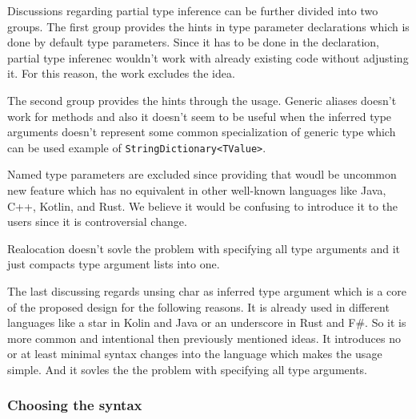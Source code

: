 Discussions regarding partial type inference can be further divided into two groups.
The first group provides the hints in type parameter declarations which is done by default type parameters.
Since it has to be done in the declaration, partial type inferenec wouldn't work with already existing code without adjusting it.
For this reason, the work excludes the idea.
\par
The second group provides the hints through the usage.
Generic aliases doesn't work for methods and also it doesn't seem to be useful when the inferred type arguments doesn't represent some common specialization of generic type which can be used example of \texttt{StringDictionary<TValue>}.
\par
Named type parameters are excluded since providing that woudl be uncommon new feature which has no equivalent in other well-known languages like Java, C++, Kotlin, and Rust.
We believe it would be confusing to introduce it to the users since it is controversial change.
\par
Realocation doesn't sovle the problem with specifying all type arguments and it just compacts type argument lists into one.
\par
The last discussing regards unsing char as inferred type argument which is a core of the proposed design for the following reasons.
It is already used in different languages like a star in Kolin and Java or an underscore in Rust and F\#.
So it is more common and intentional then previously mentioned ideas.
It introduces no or at least minimal syntax changes into the language which makes the usage simple.
And it sovles the the problem with specifying all type arguments.

\subsubsection{Choosing the syntax}

